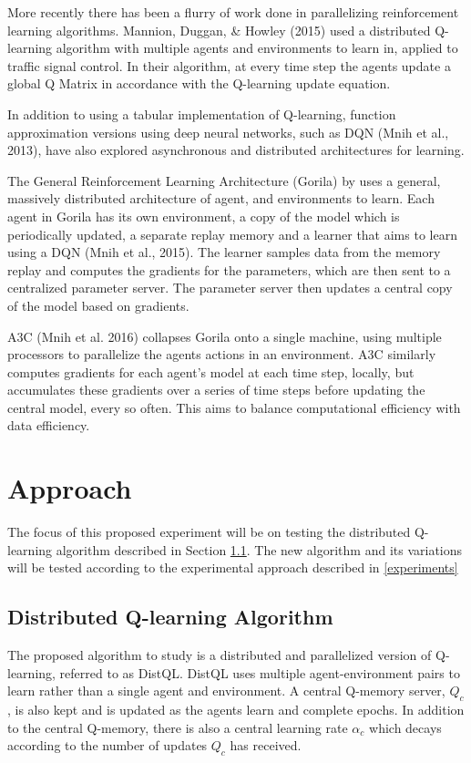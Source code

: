 \documentclass[jair,twoside,11pt,theapa]{article}
\begin{document}
More recently there has been a flurry of work done in parallelizing reinforcement learning algorithms. Mannion, Duggan, \& Howley (2015) \nocite{MANNION2015956} used a distributed Q-learning algorithm with multiple agents and environments to learn in, applied to traffic signal control. In their algorithm, at every time step the agents update a global Q Matrix in accordance with the Q-learning update equation. 

In addition to using a tabular implementation of Q-learning, function approximation versions using deep neural networks, such as DQN (Mnih et al., 2013), have also explored asynchronous and distributed architectures for learning. 

The General Reinforcement Learning Architecture (Gorila) by \cite{Gorila} uses a general, massively distributed architecture of agent, and environments to learn. Each agent in Gorila has its own environment, a copy of the model which is periodically updated, a separate replay memory and a learner that aims to learn using a DQN (Mnih et al., 2015)\nocite{Mnih2015}. The learner samples data from the memory replay and computes the gradients for the parameters, which are then sent to a centralized parameter server. The parameter server then updates a central copy of the model based on gradients. 

A3C (Mnih et al. 2016)\nocite{A3C} collapses Gorila onto a single machine, using multiple processors to parallelize the agents actions in an environment. A3C similarly computes gradients for each agent's model at each time step, locally, but accumulates these gradients over a series of time steps before updating the central model, every so often. This aims to balance computational efficiency with data efficiency. 


\section{Approach}
\label{Approach}
The focus of this proposed experiment will be on testing the distributed Q-learning algorithm described in Section \ref{algorithm}.
The new algorithm and its variations will be tested according to the experimental approach described in \ref{experiments}

\subsection{Distributed Q-learning Algorithm} 
\label{algorithm}
The proposed algorithm to study is a distributed and parallelized version of Q-learning, referred to as DistQL. 
DistQL uses multiple agent-environment pairs to learn rather than a single agent and environment. A central Q-memory server, $Q_c$, is also kept and is updated 
as the agents learn and complete epochs. In addition to the central Q-memory, there is also a central learning rate $\alpha_c$ which decays according
to the number of updates $Q_c$ has received. 
\end{document}

